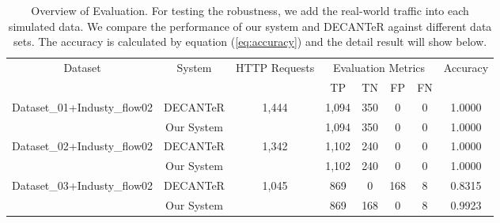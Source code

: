 \begin{table*}[!h]
\centering
\caption{Overview of Evaluation.
For testing the robustness, we add the real-world traffic into each simulated data. We compare the performance of our system and DECANTeR\cite{bortolameotti2017decanter} against different data sets. The accuracy is calculated by equation (\ref{eq:accuracy}) and the detail result will show below.}
\label{tbl:db_03}
\begin{tabular}{|c|c|c|c|c|c|c|c|}
\hline\hline
\multirow{2}{*}{Dataset}     & \multirow{2}{*}{System} & \multirow{2}{*}{HTTP Requests} & \multicolumn{4}{c|}{Evaluation Metrics} & \multirow{2}{*}{Accuracy} \\ \cline{4-7}
                             &                         &                                & TP       & TN       & FP       & FN     &                           \\ \hline
\multirow{2}{*}{Dataset\_01+Industy\_flow02} & DECANTeR \cite{bortolameotti2017decanter}                & \multirow{2}{*}{1,444}          & 1,094      & 350      & 0       & 0      & 1.0000                     \\ \cline{2-2} \cline{4-8} 
                             & Our System              &                                & 1,094      & 350      & 0       & 0      & 1.0000                    \\ \hline
\multirow{2}{*}{Dataset\_02+Industy\_flow02} & DECANTeR \cite{bortolameotti2017decanter}                & \multirow{2}{*}{1,342}          & 1,102      & 240      & 0       & 0      & 1.0000                     \\ \cline{2-2} \cline{4-8} 
                             & Our System              &                                & 1,102      & 240      & 0       & 0      & 1.0000                     \\ \hline
\multirow{2}{*}{Dataset\_03+Industy\_flow02} & DECANTeR \cite{bortolameotti2017decanter}                & \multirow{2}{*}{1,045}          & 869      & 0        & 168      & 8      & 0.8315                    \\ \cline{2-2} \cline{4-8} 
                             & Our System              &                                & 869      & 168      & 0        & 8      & 0.9923                    \\ \hline\hline
\end{tabular}
\end{table*}




